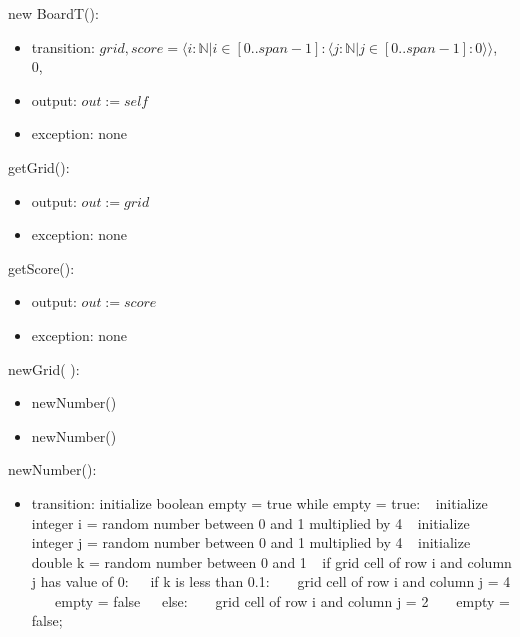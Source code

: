 \documentclass[12pt]{article}
\begin{document}
\noindent new BoardT():
\begin{itemize}
\item transition: $grid, score = \langle i : \mathbb{N} | i \in [0..span-1]: \langle j  : \mathbb{N} | j \in [0..span-1]: 0 \rangle\rangle$, 0,
\item output: $out := self$ 
\item exception: none
\end{itemize}

\noindent getGrid():
\begin{itemize}
\item output: $out := grid$
\item exception: none
\end{itemize}

\noindent getScore():
\begin{itemize}
\item output: $out := score$
\item exception: none
\end{itemize}

\noindent newGrid( ):
\begin{itemize}
\item \mbox{newNumber()}
\item \mbox{newNumber()}
\end{itemize}

\noindent newNumber():
\begin{itemize}
\item transition: \newline
      initialize boolean empty = true \newline
      while empty = true: \newline
      $~~$ initialize integer i = random number  between 0 and 1 multiplied by 4 \newline
      $~~$ initialize integer j = random number  between 0 and 1 multiplied by 4 \newline
      $~~$ initialize double k = random number between 0 and 1 \newline
      $~~$ if grid cell of row i and column j has value of 0: \newline
      $~~$$~~$ if k is less than 0.1: \newline
      $~~$$~~$$~~$ grid cell of row i and column j = 4 \newline
      $~~$$~~$$~~$ empty = false \newline
      $~~$$~~$ else: \newline 
      $~~$$~~$$~~$ grid cell of row i and column j = 2 \newline
      $~~$$~~$$~~$ empty = false; \newline
\end{itemize}
\end{document}
